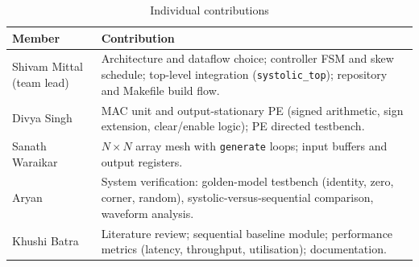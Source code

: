 \documentclass[conference,a4paper]{IEEEtran}
\begin{document}
\begin{table}[h]
\caption{Individual contributions}
\label{tab:contrib}
\centering
\scriptsize
\renewcommand{\arraystretch}{1.2}
\begin{tabularx}{\columnwidth}{@{}L{1.55cm}Y@{}}
\toprule
\textbf{Member} & \textbf{Contribution} \\
\midrule
Shivam Mittal (team lead) & Architecture and dataflow choice; controller FSM and skew schedule; top-level integration (\texttt{systolic\_top}); repository and Makefile build flow. \\
Divya Singh & MAC unit and output-stationary PE (signed arithmetic, sign extension, clear/enable logic); PE directed testbench. \\
Sanath Waraikar & $N\times N$ array mesh with \texttt{generate} loops; input buffers and output registers. \\
Aryan & System verification: golden-model testbench (identity, zero, corner, random), systolic-versus-sequential comparison, waveform analysis. \\
Khushi Batra & Literature review; sequential baseline module; performance metrics (latency, throughput, utilisation); documentation. \\
\bottomrule
\end{tabularx}
\end{table}
\end{document}
